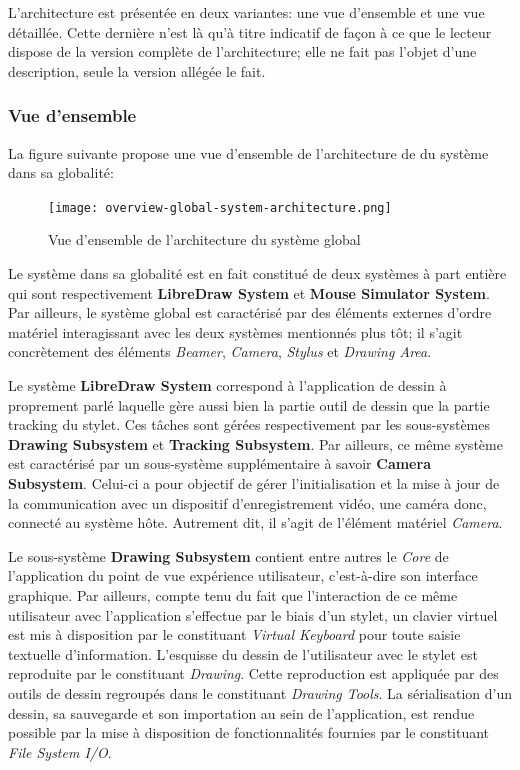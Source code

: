 \documentclass[11pt,a4paper,oldfontcommands]{memoir}
\begin{document}
L'architecture est présentée en deux variantes: une vue d'ensemble et une vue détaillée. Cette dernière n'est là qu'à titre indicatif de façon à ce que le lecteur dispose de la version complète de l'architecture; elle ne fait pas l'objet d'une description, seule la version allégée le fait.

\newpage

\subsubsection{Vue d'ensemble}

La figure suivante propose une vue d'ensemble de l'architecture de du système dans sa globalité:

\begin{figure}[H]
\centering
\texttt{[image: overview-global-system-architecture.png]}
\caption{Vue d'ensemble de l'architecture du système global}
\end{figure}

Le système dans sa globalité est en fait constitué de deux systèmes à part entière qui sont respectivement \textbf{LibreDraw System} et \textbf{Mouse Simulator System}. Par ailleurs, le système global est caractérisé par des éléments externes d'ordre matériel interagissant avec les deux systèmes mentionnés plus tôt; il s'agit concrètement des éléments \textit{Beamer}, \textit{Camera}, \textit{Stylus} et \textit{Drawing Area}.

Le système \textbf{LibreDraw System} correspond à l'application de dessin à proprement parlé laquelle gère aussi bien la partie outil de dessin que la partie tracking du stylet. Ces tâches sont gérées respectivement par les sous-systèmes \textbf{Drawing Subsystem} et \textbf{Tracking Subsystem}. Par ailleurs, ce même système est caractérisé par un sous-système supplémentaire à savoir \textbf{Camera Subsystem}. Celui-ci a pour objectif de gérer l'initialisation et la mise à jour de la communication avec un dispositif d'enregistrement vidéo, une caméra donc, connecté au système hôte. Autrement dit, il s'agit de l'élément matériel \textit{Camera}.

Le sous-système \textbf{Drawing Subsystem} contient entre autres le \textit{Core} de l'application du point de vue expérience utilisateur, c'est-à-dire son interface graphique. Par ailleurs, compte tenu du fait que l'interaction de ce même utilisateur avec l'application s'effectue par le biais d'un stylet, un clavier virtuel est mis à disposition par le constituant \textit{Virtual Keyboard} pour toute saisie textuelle d'information. L'esquisse du dessin de l'utilisateur avec le stylet est reproduite par le constituant \textit{Drawing}. Cette reproduction est appliquée par des outils de dessin regroupés dans le constituant \textit{Drawing Tools}. La sérialisation d'un dessin, sa sauvegarde et son importation au sein de l'application, est rendue possible par la mise à disposition de fonctionnalités fournies par le constituant \textit{File System I/O}.
\end{document}

